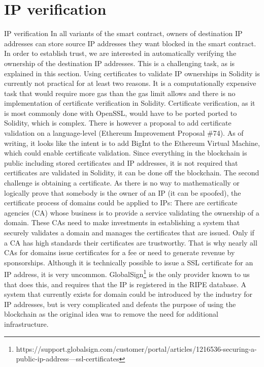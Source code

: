 \section{IP verification}
IP verification
In all variants of the smart contract, owners of destination IP addresses can store source IP addresses they want blocked in the smart contract. In order to establish trust, we are interested in automatically verifying the ownership of the destination IP addresses. This is a challenging task, as is explained in this section. Using certificates to validate IP ownerships in Solidity is currently not practical for at least two reasons.
It is a computationally expensive task that would require more gas than the gas limit allows and there is no implementation of certificate verification in Solidity. Certificate verification, as it is most commonly done with OpenSSL, would have to be ported ported to Solidity, which is complex.
There is however a proposal to add certificate validation on a language-level (Ethereum Improvement Proposal \#74). As of writing, it looks like the intent is to add BigInt to the Ethereum Virtual Machine, which could enable certificate validation.
Since everything in the blockchain is public including stored certificates and IP addresses, it is not required that certificates are validated in Solidity, it can be done off the blockchain.
The second challenge is obtaining a certificate. As there is no way to mathematically or logically prove that somebody is the owner of an IP (it can be spoofed), the certificate process of domains could be applied to IPs: There are certificate agencies (CA) whose business is to provide a service validating the ownership of a domain. These CAs need to make investments in establishing a system that securely validates a domain and manages the certificates that are issued. Only if a CA has high standards their certificates are trustworthy. That is why nearly all CAs for domains issue certificates for a fee or need to generate revenue by sponsorships. Although it is technically possible to issue a SSL certificate for an IP address, it is very uncommon. GlobalSign\footnote{https://support.globalsign.com/customer/portal/articles/1216536-securing-a-public-ip-address---ssl-certificates} is the only provider known to us that does this, and requires that the IP is registered in the RIPE database.
A system that currently exists for domain could be introduced by the industry for IP addresses, but is very complicated and defeats the purpose of using the blockchain as the original idea was to remove the need for additional infrastructure.

